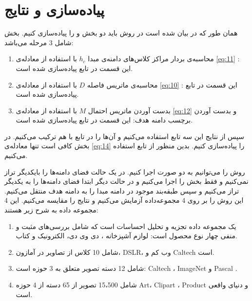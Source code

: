 	\section{پیاده‌سازی و نتایج}

همان طور که در 
\cite{wang2019easy}
بیان شده است در روش 
باید دو بخش 
و
را پیاده‌سازی کنیم. بخش 
شامل 3 مرحله می‌باشد:
\begin{enumerate}
	\item{	
		محاسبه‌ی بردار مراکز کلاس‌های دامنه‌ی مبدا $h_c$ با استفاده از معادله‌ی 
		\ref{eq:11}
		: این قسمت در تابع 
		پیاده‌سازی شده است.}
	\item{
		محاسبه‌ی ماتریس فاصله $D$ با استفاده از معادله‌ی 
		\ref{eq:10}
		: این قسمت در تابع 
		پیاده‌سازی شده است.}
	\item{
		بدست آوردن ماتریس احتمال $M$ با استفاده از معادله‌ی 
		\ref{eq:12}
		 و بدست آوردن برچسب دامنه هدف: این قسمت در تابع 
	پیاده‌سازی شده است.}  
\end{enumerate}

سپس از نتایج این سه تابع استفاده می‌کنیم و آن‌ها را در تابع 
با هم ترکیب می‌کنیم. در بخش 
کافی است تنها معادله‌ی 
\ref{eq:14}
 را پیاده‌سازی کنیم. بدین منظور از تابع 
استفاده می‌کنیم.

روش
را می‌توانیم به دو صورت اجرا کنیم. در یک حالت فضای دامنه‌ها را بایکدیگر تراز نمی‌کنیم و فقط بخش 
را اجرا می‌کنیم و در حالت دیگر ابتدا فضای دامنه‌ها را به یکدیگر تراز می‌کنیم و سپس طبقه‌بند موجود در دامنه مبدا را به دامنه هدف منتقل می‌کنیم. این روش را بر روی 4 مجموعه‌داده آزمایش می‌کنیم و نتایج را مقایسه می‌کنیم. این 4 مجموعه داده به شرح زیر هستند:
\begin{enumerate}
	\item {
		یک مجموعه داده تجزیه و تحلیل احساسات است که شامل بررسی‌های مثبت و منفی چهار نوع محصول است: لوازم آشپزخانه ، دی وی دی، الکترونیک و کتاب.}

	\item{
		شامل 10 کلاس از تصاویر در آمازون، DSLR، وب کم و Caltech است.
	}
	\item {
		شامل 12 دسته تصویر متعلق به 3 حوزه است: Caltech ، ImageNet  و Pascal .
	}

	\item {
		شامل 15،500 تصویر از 65 دسته از 4 حوزه Art، Clipart ، Product و دنیای واقعی است.
	}
\end{enumerate}

